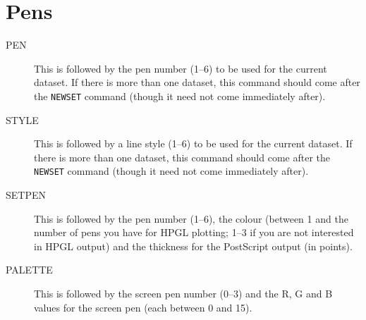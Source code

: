 \documentclass{report}
\begin{document}
\section{Pens}
\begin{description}
\item[PEN] This is followed by the pen number (1--6) to be used for the current
dataset. If there is more than one dataset, this command should come after the
{\tt NEWSET} command (though it need not come immediately after).
\item[STYLE] This is followed by a line style (1--6) to be used for the current
dataset. If there is more than one dataset, this command should come after the
{\tt NEWSET} command (though it need not come immediately after).
\item[SETPEN] This is followed by the pen number (1--6), the colour (between  1 and 
the number of pens you have for HPGL plotting; 1--3 if you are not interested in HPGL 
output) and the thickness for the PostScript output (in points).
\item[PALETTE] This is followed by the screen pen number (0--3) and the R, G and B 
values for the screen pen (each between 0 and 15).
\end{description}
\end{document}
